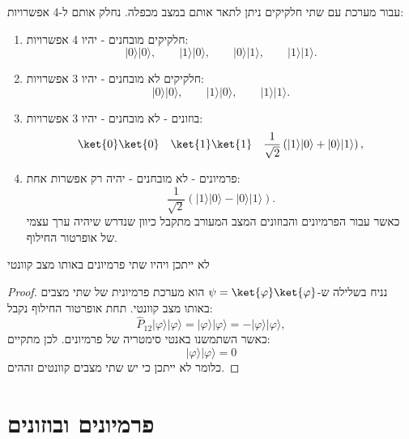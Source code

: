 \documentclass{tstextbook}
\begin{document}
\begin{proposition}
עבור מערכת עם שתי חלקיקים ניתן לתאר אותם במצב מכפלה. נחלק אותם ל-4 אפשרויות:

  \begin{enumerate}
    \item חלקיקים מובחנים - יהיו 4 אפשרויות: 
$$|0\rangle|0\rangle,\qquad|1\rangle|0\rangle,\qquad|0\rangle|1\rangle,\qquad|1\rangle|1\rangle.$$


    \item חלקיקים לא מובחנים - יהיו 3 אפשרויות: 
$$|0\rangle|0\rangle,\qquad|1\rangle|0\rangle,\qquad|1\rangle|1\rangle.$$


    \item בוזונים - לא מובחנים - יהיו 3 אפשרויות: 
$$\ket{0} \ket{0} \quad \ket{1} \ket{1} \quad \frac{1}{\sqrt{2}}\left(|1\rangle|0\rangle+|0\rangle|1\rangle\right),$$


    \item פרמיונים - לא מובחנים - יהיה רק אפשרות אחת: 
$$\frac{1}{\sqrt{2}}\left(|1\rangle|0\rangle-|0\rangle|1\rangle\right).$$
כאשר עבור הפרמיונים והבוזונים המצב המעורב מתקבל כיוון שנדרש שיהיה ערך עצמי של אופרטור החילוף.


  \end{enumerate}
\end{proposition}
\begin{proposition}
לא ייתכן ויהיו שתי פרמיונים באותו מצב קוונטי

\end{proposition}
\begin{proof}
נניח בשלילה ש-\(\psi=\ket{\varphi}\ket{\varphi}\) הוא מערכת פרמיונית של שתי מצבים באותו מצב קוונטי. תחת אופרטור החילוף נקבל:
$$\hat{P}_{12}|\varphi\rangle|\varphi\rangle=|\varphi\rangle|\varphi\rangle=-|\varphi\rangle|\varphi\rangle,$$
כאשר השתמשנו באנטי סימטריה של פרמיונים. לכן מתקיים:
$$|\varphi\rangle|\varphi\rangle=0$$
כלומר לא ייתכן כי יש שתי מצבים קוונטים זההים. 

\end{proof}
\section{פרמיונים ובוזונים}
\end{document}
